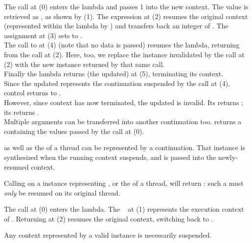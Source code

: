 
The  call at (0) enters the lambda and passes 1 into the
new context. The value is retrieved as , as shown by (1). The expression
 at (2) resumes the original context (represented
within the lambda by ) and transfers back an integer of .
The assignment at (3) sets  to .\\

The call to  at (4) (note that no data is passed) resumes the
lambda, returning from the  call at (2). Here, too,
we replace the \cont instance  invalidated by the \resume call at (2)
with the new instance returned by that same \resume call.\\

Finally the lambda returns (the updated)  at (5), terminating its
context.\\

Since the updated  represents the continuation suspended by the call at
(4), control returns to \main.\\

However, since context  has now terminated, the updated  is
invalid. Its \opbool returns ; its  returns
.\\

Multiple arguments can be transferred into another continuation too.
 returns a 
containing the values passed by the \callcc call at (0).


\label{subsec:main}

\main as well as the \entryfn of a thread can be represented by a continuation.
That \cont instance is synthesized when the running context suspends, and is
passed into the newly-resumed context.

Calling \anythread on a \cont instance representing \main, or
the \entryfn of a thread, will return : such a \cont
must \emph{only} be resumed on its original thread.

The  call at (0) enters the lambda. The \cont\  at (1)
represents the execution context of \main. Returning  at (2) resumes the
original context, switching back to \main.


Any context represented by a valid \cont instance is necessarily suspended.\\

